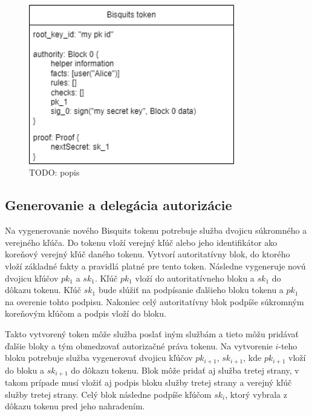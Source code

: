 \begin{figure}
    \centerline{\includegraphics[width=0.8\textwidth]{images/bisquits_token2}}
    \caption[Základný Bisquits token]{TODO: popis}
    \label{fig:bisquits_token}
\end{figure}

\subsection{Generovanie a delegácia autorizácie}

Na vygenerovanie nového Bisquits tokenu potrebuje služba dvojicu súkromného a verejného kľúča. Do tokenu vloží verejný kľúč alebo jeho identifikátor ako koreňový verejný kľúč daného tokenu. Vytvorí autoritatívny blok, do ktorého vloží základné fakty a pravidlá platné pre tento token. Následne vygeneruje novú dvojicu kľúčov $pk_1$ a $sk_1$. Kľúč $pk_1$ vloží do autoritatívneho bloku a $sk_1$ do dôkazu tokenu. Kľúč $sk_1$ bude slúžiť na podpísanie ďalšieho bloku tokenu a $pk_1$ na overenie tohto podpisu. Nakoniec celý autoritatívny blok podpíše súkromným koreňovým kľúčom a podpis vloží do bloku.

Takto vytvorený token môže služba poslať iným službám a tieto môžu pridávať ďalšie bloky a tým obmedzovať autorizačné práva tokenu. Na vytvorenie $i$-teho bloku potrebuje služba vygenerovať dvojicu kľúčov $pk_{i+1}$, $sk_{i+1}$, kde $pk_{i+1}$ vloží do bloku a $sk_{i+1}$ do dôkazu tokenu. Blok môže pridať aj služba tretej strany, v takom prípade musí vložiť aj podpis bloku služby tretej strany a verejný kľúč služby tretej strany. Celý blok následne podpíše kľúčom $sk_i$, ktorý vybrala z dôkazu tokenu pred jeho nahradením.


